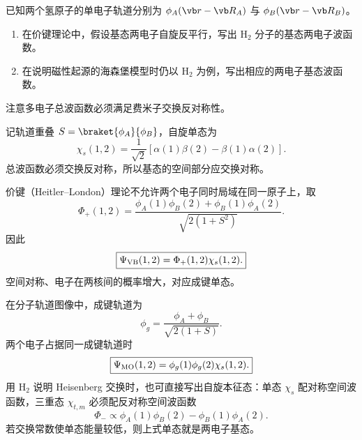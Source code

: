 \begin{question}[10 分]
已知两个氢原子的单电子轨道分别为 $\phi_A(\vb r-\vb R_A)$ 与 $\phi_B(\vb r-\vb R_B)$。
\begin{enumerate}
  \item 在价键理论中，假设基态两电子自旋反平行，写出 $\mathrm H_2$ 分子的基态两电子波函数。
  \item 在说明磁性起源的海森堡模型时仍以 $\mathrm H_2$ 为例，写出相应的两电子基态波函数。
\end{enumerate}
注意多电子总波函数必须满足费米子交换反对称性。


\begin{solution}
记轨道重叠
$S=\braket{\phi_A}{\phi_B}$，自旋单态为
\[
 \chi_s(1,2)=\frac1{\sqrt2}
 [\alpha(1)\beta(2)-\beta(1)\alpha(2)].
\]
总波函数必须交换反对称，所以基态的空间部分应交换对称。

价键（Heitler--London）理论不允许两个电子同时局域在同一原子上，取
\[
 \Phi_+(1,2)=\frac{
 \phi_A(1)\phi_B(2)+\phi_B(1)\phi_A(2)}
 {\sqrt{2(1+S^2)}}.
\]
因此
\[
 \boxed{\Psi_{\rm VB}(1,2)=\Phi_+(1,2)\chi_s(1,2).}
\]
空间对称、电子在两核间的概率增大，对应成键单态。

在分子轨道图像中，成键轨道为
\[
 \phi_g=\frac{\phi_A+\phi_B}{\sqrt{2(1+S)}}.
\]
两个电子占据同一成键轨道时
\[
 \boxed{\Psi_{\rm MO}(1,2)=\phi_g(1)\phi_g(2)\chi_s(1,2).}
\]
用 H$_2$ 说明 Heisenberg 交换时，也可直接写出自旋本征态：单态
$\chi_s$ 配对称空间波函数，三重态
$\chi_{t,m}$ 必须配反对称空间波函数
\[
 \Phi_-\propto\phi_A(1)\phi_B(2)-\phi_B(1)\phi_A(2).
\]
若交换常数使单态能量较低，则上式单态就是两电子基态。
\end{solution}
\end{question}

